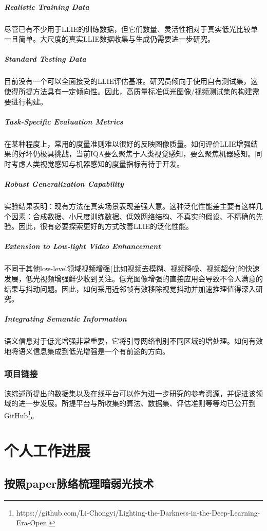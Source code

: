 \documentclass[letterpaper,12pt]{article}
\begin{document}
		\subparagraph{Realistic Training Data}
		
		尽管已有不少用于LLIE的训练数据，但它们数量、灵活性相对于真实低光比较单一且简单。大尺度的真实LLIE数据收集与生成仍需要进一步研究。
		
		\subparagraph{Standard Testing Data}
		
		目前没有一个可以全面接受的LLIE评估基准。研究员倾向于使用自有测试集，这使得所提方法具有一定倾向性。因此，高质量标准低光图像/视频测试集的构建需要进行构建。
		
		\subparagraph{Task-Specific Evaluation Metrics}
		
		在某种程度上，常用的度量准则难以很好的反映图像质量。如何评价LLIE增强结果的好坏仍极具挑战，当前IQA要么聚焦于人类视觉感知，要么聚焦机器感知。同时考虑人类视觉感知与机器感知的度量指标有待于开发。
		
		\subparagraph{Robust Generalization Capability}
		
		实验结果表明：现有方法在真实场景表现差强人意。这种泛化性能差主要有这样几个因素：合成数据、小尺度训练数据、低效网络结构、不真实的假设、不精确的先验。因此，很有必要探索更好的方式改善LLIE的泛化性能。
		
		\subparagraph{Extension to Low-light Video Enhancement}
		
		不同于其他low-level领域视频增强(比如视频去模糊、视频降噪、视频超分)的快速发展，低光视频增强鲜少收到关注。低光图像增强的直接应用会导致不令人满意的结果与抖动问题。因此，如何采用近邻帧有效移除视觉抖动并加速推理值得深入研究。
		
		\subparagraph{Integrating Semantic Information}
		
		语义信息对于低光增强非常重要，它将引导网络判别不同区域的增处理。如何有效地将语义信息集成到低光增强是一个有前途的方向。
	
	
	\subsubsection{项目链接}
	
	该综述所提出的数据集以及在线平台可以作为进一步研究的参考资源，并促进该领域的进一步发展。所提平台与所收集的算法、数据集、评估准则等等均已公开到GitHub\footnote{https://github.com/Li-Chongyi/Lighting-the-Darkness-in-the-Deep-Learning-Era-Open.
	}。
			
	\section{个人工作进展}
					
		\subsection{按照paper脉络梳理暗弱光技术}
			
\end{document}
